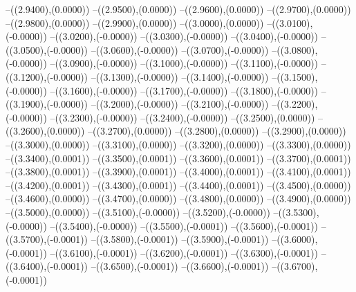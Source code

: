 {	--({\sx*(2.9400)},{\sy*(0.0000)})
	--({\sx*(2.9500)},{\sy*(0.0000)})
	--({\sx*(2.9600)},{\sy*(0.0000)})
	--({\sx*(2.9700)},{\sy*(0.0000)})
	--({\sx*(2.9800)},{\sy*(0.0000)})
	--({\sx*(2.9900)},{\sy*(0.0000)})
	--({\sx*(3.0000)},{\sy*(0.0000)})
	--({\sx*(3.0100)},{\sy*(-0.0000)})
	--({\sx*(3.0200)},{\sy*(-0.0000)})
	--({\sx*(3.0300)},{\sy*(-0.0000)})
	--({\sx*(3.0400)},{\sy*(-0.0000)})
	--({\sx*(3.0500)},{\sy*(-0.0000)})
	--({\sx*(3.0600)},{\sy*(-0.0000)})
	--({\sx*(3.0700)},{\sy*(-0.0000)})
	--({\sx*(3.0800)},{\sy*(-0.0000)})
	--({\sx*(3.0900)},{\sy*(-0.0000)})
	--({\sx*(3.1000)},{\sy*(-0.0000)})
	--({\sx*(3.1100)},{\sy*(-0.0000)})
	--({\sx*(3.1200)},{\sy*(-0.0000)})
	--({\sx*(3.1300)},{\sy*(-0.0000)})
	--({\sx*(3.1400)},{\sy*(-0.0000)})
	--({\sx*(3.1500)},{\sy*(-0.0000)})
	--({\sx*(3.1600)},{\sy*(-0.0000)})
	--({\sx*(3.1700)},{\sy*(-0.0000)})
	--({\sx*(3.1800)},{\sy*(-0.0000)})
	--({\sx*(3.1900)},{\sy*(-0.0000)})
	--({\sx*(3.2000)},{\sy*(-0.0000)})
	--({\sx*(3.2100)},{\sy*(-0.0000)})
	--({\sx*(3.2200)},{\sy*(-0.0000)})
	--({\sx*(3.2300)},{\sy*(-0.0000)})
	--({\sx*(3.2400)},{\sy*(-0.0000)})
	--({\sx*(3.2500)},{\sy*(0.0000)})
	--({\sx*(3.2600)},{\sy*(0.0000)})
	--({\sx*(3.2700)},{\sy*(0.0000)})
	--({\sx*(3.2800)},{\sy*(0.0000)})
	--({\sx*(3.2900)},{\sy*(0.0000)})
	--({\sx*(3.3000)},{\sy*(0.0000)})
	--({\sx*(3.3100)},{\sy*(0.0000)})
	--({\sx*(3.3200)},{\sy*(0.0000)})
	--({\sx*(3.3300)},{\sy*(0.0000)})
	--({\sx*(3.3400)},{\sy*(0.0001)})
	--({\sx*(3.3500)},{\sy*(0.0001)})
	--({\sx*(3.3600)},{\sy*(0.0001)})
	--({\sx*(3.3700)},{\sy*(0.0001)})
	--({\sx*(3.3800)},{\sy*(0.0001)})
	--({\sx*(3.3900)},{\sy*(0.0001)})
	--({\sx*(3.4000)},{\sy*(0.0001)})
	--({\sx*(3.4100)},{\sy*(0.0001)})
	--({\sx*(3.4200)},{\sy*(0.0001)})
	--({\sx*(3.4300)},{\sy*(0.0001)})
	--({\sx*(3.4400)},{\sy*(0.0001)})
	--({\sx*(3.4500)},{\sy*(0.0000)})
	--({\sx*(3.4600)},{\sy*(0.0000)})
	--({\sx*(3.4700)},{\sy*(0.0000)})
	--({\sx*(3.4800)},{\sy*(0.0000)})
	--({\sx*(3.4900)},{\sy*(0.0000)})
	--({\sx*(3.5000)},{\sy*(0.0000)})
	--({\sx*(3.5100)},{\sy*(-0.0000)})
	--({\sx*(3.5200)},{\sy*(-0.0000)})
	--({\sx*(3.5300)},{\sy*(-0.0000)})
	--({\sx*(3.5400)},{\sy*(-0.0000)})
	--({\sx*(3.5500)},{\sy*(-0.0001)})
	--({\sx*(3.5600)},{\sy*(-0.0001)})
	--({\sx*(3.5700)},{\sy*(-0.0001)})
	--({\sx*(3.5800)},{\sy*(-0.0001)})
	--({\sx*(3.5900)},{\sy*(-0.0001)})
	--({\sx*(3.6000)},{\sy*(-0.0001)})
	--({\sx*(3.6100)},{\sy*(-0.0001)})
	--({\sx*(3.6200)},{\sy*(-0.0001)})
	--({\sx*(3.6300)},{\sy*(-0.0001)})
	--({\sx*(3.6400)},{\sy*(-0.0001)})
	--({\sx*(3.6500)},{\sy*(-0.0001)})
	--({\sx*(3.6600)},{\sy*(-0.0001)})
	--({\sx*(3.6700)},{\sy*(-0.0001)})
}
